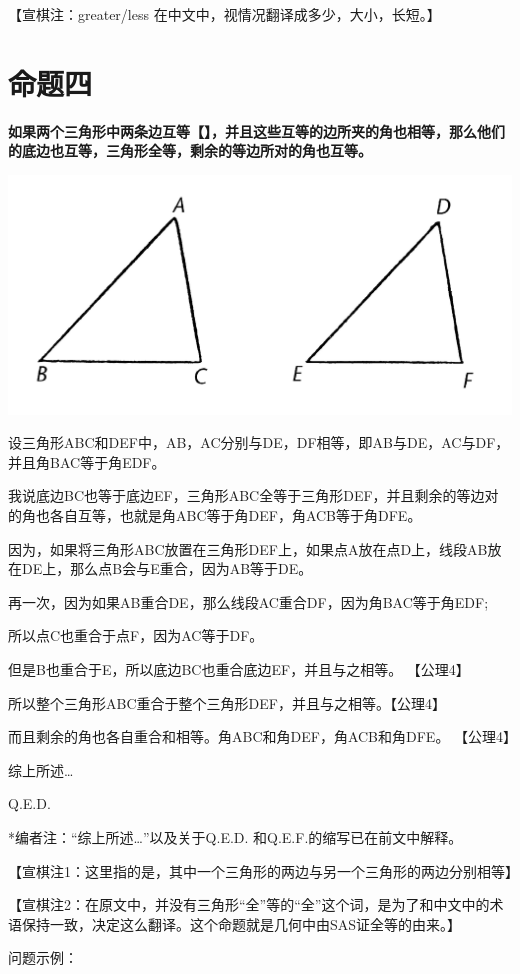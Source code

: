 \documentclass[
]{book}
\begin{document}
【宣棋注：greater/less 在中文中，视情况翻译成多少，大小，长短。】

\hypertarget{ux547dux9898ux56db}{%
\section{命题四}\label{ux547dux9898ux56db}}

\textbf{如果两个三角形中两条边互等【】，并且这些互等的边所夹的角也相等，那么他们的底边也互等，三角形全等，剩余的等边所对的角也互等。}

\includegraphics[width=0.5\linewidth]{./image/img451}

设三角形ABC和DEF中，AB，AC分别与DE，DF相等，即AB与DE，AC与DF，并且角BAC等于角EDF。

我说底边BC也等于底边EF，三角形ABC全等于三角形DEF，并且剩余的等边对的角也各自互等，也就是角ABC等于角DEF，角ACB等于角DFE。

因为，如果将三角形ABC放置在三角形DEF上，如果点A放在点D上，线段AB放在DE上，那么点B会与E重合，因为AB等于DE。

再一次，因为如果AB重合DE，那么线段AC重合DF，因为角BAC等于角EDF;

所以点C也重合于点F，因为AC等于DF。

但是B也重合于E，所以底边BC也重合底边EF，并且与之相等。 【公理4】

所以整个三角形ABC重合于整个三角形DEF，并且与之相等。【公理4】

而且剩余的角也各自重合和相等。角ABC和角DEF，角ACB和角DFE。 【公理4】

综上所述\ldots*

Q.E.D.

*编者注：``综上所述\ldots{}''以及关于Q.E.D. 和Q.E.F.的缩写已在前文中解释。

【宣棋注1：这里指的是，其中一个三角形的两边与另一个三角形的两边分别相等】

【宣棋注2：在原文中，并没有三角形``全''等的``全''这个词，是为了和中文中的术语保持一致，决定这么翻译。这个命题就是几何中由SAS证全等的由来。】

问题示例：
\end{document}
